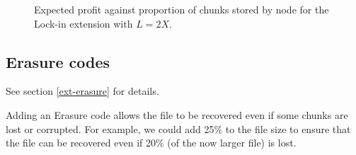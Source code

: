 \documentclass[12pt,a4paper,twoside,openright]{report}
\begin{document}
\begin{figure}[h]
\caption[Expected attacker profit: lock-in]{Expected profit against proportion of chunks stored by node for the Lock-in extension with $L = 2X$.}
\label{eval-graph-lockin}
\end{figure}



\subsection{Erasure codes}

See section \ref{ext-erasure} for details.

Adding an Erasure code allows the file to be recovered even if some chunks are lost or corrupted.
For example, we could add 25\% to the file size to ensure that the file can be recovered even if 20\% (of the now larger file)
is lost.
\end{document}
